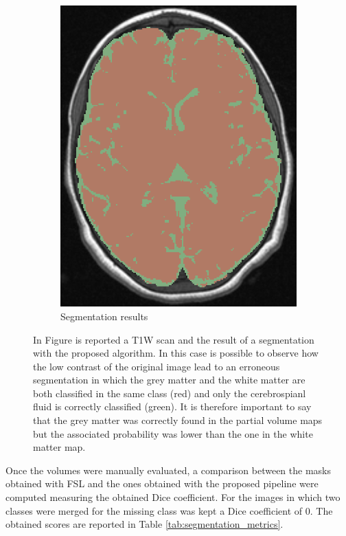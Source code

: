 \documentclass{standalone}
\begin{document}
\begin{figure}[h!]
\begin{subfigure}[b]{0.49\textwidth}
             \includegraphics[scale=0.3]{img/Chap3/SEG0.png}
             \caption{Segmentation results}
        \end{subfigure}
        \caption{In Figure is reported a T1W scan and the result of a segmentation with the proposed algorithm. In this case is possible to observe how the low contrast of the original image lead to an erroneous segmentation in which the grey matter and the white matter are both classified in the same class (red) and only the cerebrospianl fluid is correctly classified (green). It is therefore important to say that the grey matter was correctly found in the partial volume maps but the associated probability was lower than the one in the white matter map.}\label{fig:seg_fail}
\end{figure}

Once the volumes were manually evaluated, a comparison between the masks obtained with FSL and the ones obtained with the proposed pipeline were computed measuring the obtained Dice coefficient.
For the images in which two classes were merged for the missing class was kept a Dice coefficient of $0$.
The obtained scores are reported in Table \ref{tab:segmentation_metrics}.
\end{document}
